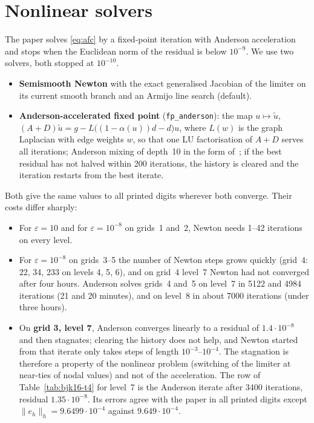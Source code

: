 \documentclass[11pt]{article}
\newcommand{\eps}{\varepsilon}
\begin{document}
\section{Nonlinear solvers}\label{sec:solvers}

The paper solves \eqref{eq:afc} by a fixed-point iteration with Anderson acceleration~\cite{WN11} and stops when the
Euclidean norm of the residual is below $10^{-9}$. We use two solvers, both stopped at $10^{-10}$.
\begin{itemize}[leftmargin=*]
\item \textbf{Semismooth Newton} with the exact generalised Jacobian of the limiter on its current smooth branch and an
  Armijo line search (default).
\item \textbf{Anderson-accelerated fixed point} (\texttt{fp\_anderson}): the map
  $u\mapsto\tilde u$, $(A+D)\tilde u=g-L\bigl((1-\alpha(u))d-d\bigr)u$, where $L(w)$ is the graph Laplacian with edge
  weights $w$, so that one LU factorisation of $A+D$ serves all iterations; Anderson mixing of depth~10 in the form
  of~\cite[Sect.~3]{WN11}; if the best residual has not halved within 200 iterations, the history is cleared and the
  iteration restarts from the best iterate.
\end{itemize}

Both give the same values to all printed digits wherever both converge. Their costs differ sharply:
\begin{itemize}[leftmargin=*]
\item For $\eps=10$ and for $\eps=10^{-8}$ on grids~1 and~2, Newton needs 1--42 iterations on every level.
\item For $\eps=10^{-8}$ on grids~3--5 the number of Newton steps grows quickly (grid~4: 22, 34, 233 on levels 4, 5, 6),
  and on grid~4 level~7 Newton had not converged after four hours. Anderson solves grids~4 and~5 on level~7 in
  5122 and 4984 iterations (21 and 20 minutes), and on level~8 in about 7000 iterations (under three hours).
\item On \textbf{grid 3, level 7}, Anderson converges linearly to a residual of $1.4\cdot10^{-8}$ and then stagnates;
  clearing the history does not help, and Newton started from that iterate only takes steps of length
  $10^{-3}$--$10^{-4}$. The stagnation is therefore a property of the nonlinear problem (switching of the limiter at
  near-ties of nodal values) and not of the acceleration. The row of Table~\ref{tab:bjk16-t4} for level~7 is the
  Anderson iterate after 3400 iterations, residual $1.35\cdot10^{-8}$. Its errors agree with the paper in all
  printed digits except $\|e_h\|_h=9.6499\cdot10^{-4}$ against $9.649\cdot10^{-4}$.
\end{itemize}
\end{document}
